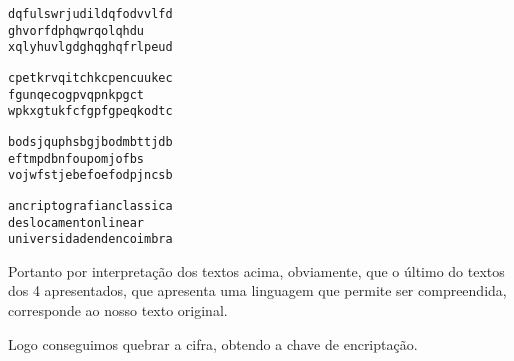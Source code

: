 \begin{verbatim}
dqfulswrjudildqfodvvlfd
ghvorfdphqwrqolqhdu
xqlyhuvlgdghqghqfrlpeud
\end{verbatim}
\begin{verbatim}
cpetkrvqitchkcpencuukec
fgunqecogpvqpnkpgct
wpkxgtukfcfgpfgpeqkodtc
\end{verbatim}
\begin{verbatim}
bodsjquphsbgjbodmbttjdb
eftmpdbnfoupomjofbs
vojwfstjebefoefodpjncsb
\end{verbatim}
\begin{verbatim}
ancriptografianclassica
deslocamentonlinear
universidadendencoimbra
\end{verbatim}

Portanto por interpretação dos textos acima, obviamente, que o último do textos dos 4 apresentados, que apresenta uma linguagem que permite ser compreendida, corresponde ao nosso texto original. 

Logo conseguimos quebrar a cifra, obtendo a chave de encriptação.

